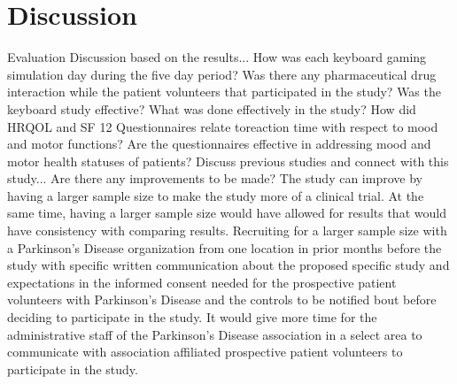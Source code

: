 \documentclass[12pt,letterpaper]{article}
\begin{document}
\section{Discussion}
 Evaluation Discussion based on the results...
 How was each keyboard gaming simulation day during the five day period?
 Was there any pharmaceutical drug interaction while the patient volunteers that participated in the study?
 Was the keyboard study effective?
 What was done effectively in the study?
 How did HRQOL and SF 12 Questionnaires relate toreaction time with respect to mood and motor functions?
 Are the questionnaires effective in addressing mood and motor health statuses of patients?
 Discuss previous studies and connect with this study...
 Are there any improvements to be made? The study can improve by having a larger sample size to make the study more of a clinical trial. At the same time, having a larger sample size would have allowed for results that would have consistency with comparing results. Recruiting for a larger sample size with a Parkinson's Disease organization from one location in prior months before the study with specific written communication about the proposed specific study and expectations in the informed consent needed for the prospective patient volunteers with Parkinson's Disease and the controls to be notified bout before deciding to participate in the study. It would give more time for the administrative staff of the Parkinson's Disease association in a select area to communicate with association affiliated prospective patient volunteers to participate in the study. 

\nocite{*}


\end{document}
